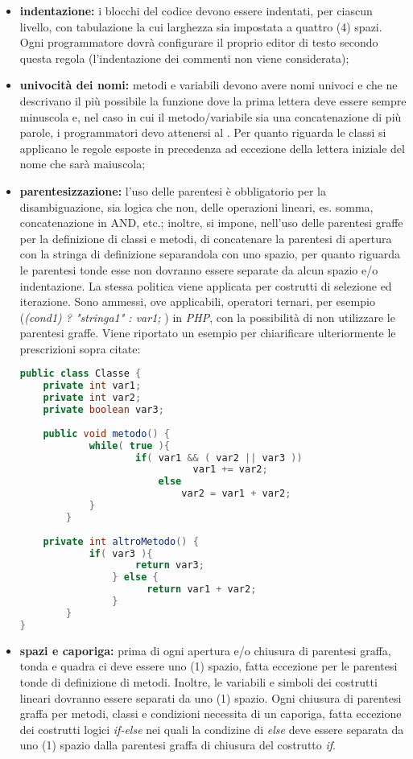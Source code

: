 					\begin{itemize}
						\item \textbf{indentazione:} i blocchi del codice devono essere indentati, per ciascun livello, con tabulazione la cui larghezza sia impostata a quattro (4) spazi. Ogni programmatore dovrà configurare il proprio editor di testo secondo questa regola (l'indentazione dei commenti non viene considerata);
						\item \textbf{univocità dei nomi:} metodi e variabili devono avere nomi univoci e che ne descrivano il più possibile la funzione dove la prima lettera deve essere sempre minuscola e, nel caso in cui il metodo/variabile sia una concatenazione di più parole, i programmatori devo attenersi al .
						Per quanto riguarda le classi si applicano le regole esposte in precedenza ad eccezione della lettera iniziale del nome che sarà maiuscola;
						\item \textbf{parentesizzazione:} l'uso delle parentesi è obbligatorio per la disambiguazione, sia logica che non, delle operazioni lineari, es. somma, concatenazione in AND, etc.; inoltre, si impone, nell'uso delle parentesi graffe per la definizione di classi e metodi, di concatenare la parentesi di apertura con la stringa di definizione separandola con uno spazio, per quanto riguarda le parentesi tonde esse non dovranno essere separate da alcun spazio e/o indentazione. La stessa politica viene applicata per costrutti di selezione ed iterazione. Sono ammessi, ove applicabili, operatori ternari, per esempio (\textit{(cond1) ? "stringa1" : var1; }) in \textit{PHP}, con la possibilità di non utilizzare le parentesi graffe. Viene riportato un esempio per chiarificare ulteriormente le prescrizioni sopra citate:
						
						\begin{lstlisting}[language=java,captionpos=b,caption={Esempio di dichiarazione di una classe in Java}]
public class Classe {
	private int var1;
	private int var2;
	private boolean var3;
	
	public void metodo() {
		    while( true ){
				    if( var1 && ( var2 || var3 ))
							  var1 += var2;
						else
						    var2 = var1 + var2;
			}
		}
	
	private int altroMetodo() {
		    if( var3 ){
				  	return var3;
				} else {
					  return var1 + var2;
				}
		}
}
						\end{lstlisting}

						\item \textbf{spazi e caporiga:} prima di ogni apertura e/o chiusura di parentesi graffa, tonda e quadra ci deve essere uno (1) spazio, fatta eccezione per le parentesi tonde di definizione di metodi. Inoltre, le variabili e simboli dei costrutti lineari dovranno essere separati da uno (1) spazio. Ogni chiusura di parentesi graffa per metodi, classi e condizioni necessita di un caporiga, fatta eccezione dei costrutti logici \textit{if-else} nei quali la condizine di \textit{else} deve essere separata da uno (1) spazio dalla parentesi graffa di chiusura del costrutto \textit{if}.
					\end{itemize}


